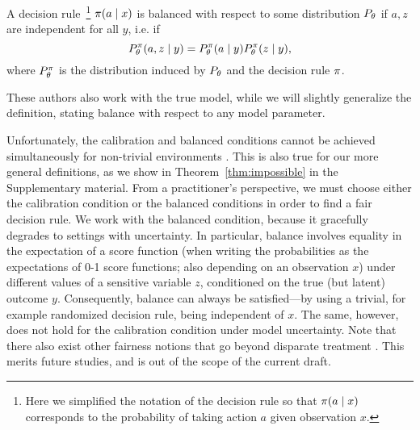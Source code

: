 \fi
\begin{definition}
  A decision rule~\footnote{Here we simplified the notation of the decision rule so that $\pi(a \mid x)$ corresponds to the probability of taking action $a$
given observation $x$.} $\pi(a \mid x)$ is balanced with respect to some distribution $P_\theta$ if $a, z$ are independent for all $y$, i.e. if
  \begin{equation}
    \label{eq:balanced-rule}
    P_\theta^\pi(a, z \mid y) =  P_\theta^\pi(a \mid y) P_\theta^\pi(z \mid y),
  \end{equation}
  where $P_\theta^\pi$ is the distribution induced by $P_\theta$ and the decision rule $\pi$.
  \label{def:balanced-rule}
\end{definition}
These authors also work with the true model, while we will
slightly generalize the definition, stating balance with respect to
any model parameter.

Unfortunately, the calibration and balanced conditions cannot be
achieved simultaneously for non-trivial environments
\citep{kleinberg2016inherent}. This is also true for our more general
definitions, as we show in Theorem~\ref{thm:impossible} in the
Supplementary material.  From a practitioner's perspective,
we must choose either the calibration condition or the balanced conditions
in order to find a fair decision rule.
We work with the balanced
condition, because it gracefully degrades to settings with
uncertainty. In particular, balance involves equality in the
expectation of a score function (when writing the probabilities as the
expectations of 0-1 score functions; also depending on an observation
$x$) under different values of a sensitive variable $z$, conditioned
on the true (but latent) outcome $y$. Consequently, balance can always
be satisfied---by using a trivial, for example randomized
decision rule, being independent of $x$.  The same, however, does not
hold for the calibration condition under model uncertainty. Note that there also exist other fairness notions that go beyond disparate treatment \citep{zafar2017fairness}. This merits future studies, and is out of the scope of the current draft.
 
